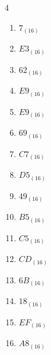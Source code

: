 \begin{multicols}{4}
\begin{enumerate}
  \item $7_{(16)}$

        \phantom{$=7$}

  \item $E3_{(16)}$

        \phantom{$=227$}

  \item $62_{(16)}$

        \phantom{$=98$}

  \item $E9_{(16)}$

        \phantom{$=233$}

  \item $E9_{(16)}$

        \phantom{$=233$}

  \item $69_{(16)}$

        \phantom{$=105$}

  \item $C7_{(16)}$

        \phantom{$=199$}

  \item $D5_{(16)}$

        \phantom{$=213$}

  \item $49_{(16)}$

        \phantom{$=73$}

\columnbreak %

  \item $B5_{(16)}$

        \phantom{$=181$}

  \item $C5_{(16)}$

        \phantom{$=197$}

  \item $CD_{(16)}$

        \phantom{$=205$}

  \item $6B_{(16)}$

        \phantom{$=107$}

  \item $18_{(16)}$

        \phantom{$=24$}

  \item $EF_{(16)}$

        \phantom{$=239$}

  \item $A8_{(16)}$


\end{enumerate}
\end{multicols}
